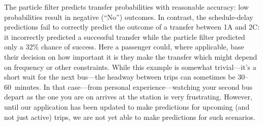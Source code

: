 The particle filter predicts transfer probabilities with reasonable accuracy: low probabilities result in negative (``No'') outcomes. In contrast, the schedule-delay predictions fail to correctly predict the outcome of a transfer between 1A and 2C: it incorrectly predicted a successful transfer while the particle filter predicted only a 32\% chance of success. Here a passenger could, where applicable, base their decision on how important it is they make the transfer which might depend on frequency or other constraints. While this example is somewhat trivial---it's a short wait for the next bus---the headway between trips can sometimes be 30--60~minutes. In that case---from personal experience---watching your second bus depart as the one you are on arrives at the station is very frustrating. However, until our application has been updated to make predictions for upcoming (and not just active) trips, we are not yet able to make predictions for such scenarios.


